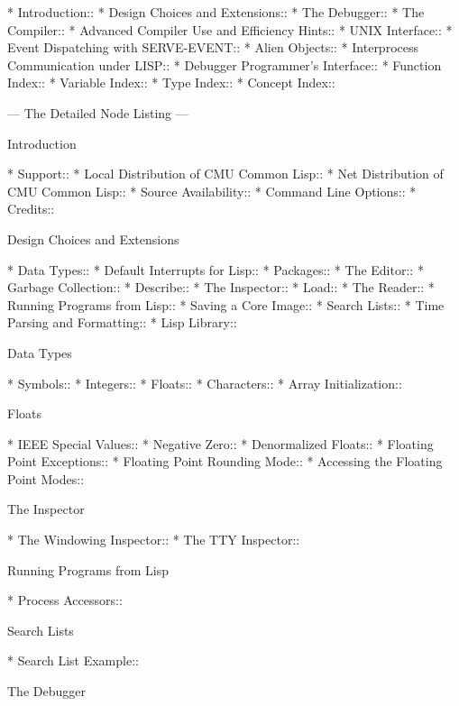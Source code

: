 \begin{menu}
* Introduction::                
* Design Choices and Extensions:: 
* The Debugger::                
* The Compiler::                
* Advanced Compiler Use and Efficiency Hints::  
* UNIX Interface::              
* Event Dispatching with SERVE-EVENT::  
* Alien Objects::               
* Interprocess Communication under LISP::  
* Debugger Programmer's Interface::  
* Function Index::              
* Variable Index::              
* Type Index::                  
* Concept Index::               

 --- The Detailed Node Listing ---

Introduction

* Support::                     
* Local Distribution of CMU Common Lisp::  
* Net Distribution of CMU Common Lisp::  
* Source Availability::         
* Command Line Options::        
* Credits::                     

Design Choices and Extensions

* Data Types::                  
* Default Interrupts for Lisp::  
* Packages::                    
* The Editor::                  
* Garbage Collection::          
* Describe::                    
* The Inspector::               
* Load::                        
* The Reader::                  
* Running Programs from Lisp::  
* Saving a Core Image::         
* Search Lists::                
* Time Parsing and Formatting::  
* Lisp Library::                

Data Types

* Symbols::                     
* Integers::                    
* Floats::                      
* Characters::                  
* Array Initialization::        

Floats

* IEEE Special Values::         
* Negative Zero::               
* Denormalized Floats::         
* Floating Point Exceptions::   
* Floating Point Rounding Mode::  
* Accessing the Floating Point Modes::  

The Inspector

* The Windowing Inspector::     
* The TTY Inspector::           

Running Programs from Lisp

* Process Accessors::           

Search Lists

* Search List Example::         

The Debugger


\end{menu}
